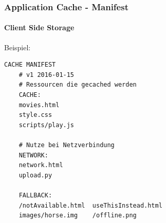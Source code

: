 \begin{frame}[fragile]
\frametitle{Application Cache - Manifest}
\framesubtitle{Client Side Storage}
	Beispiel:
	\begin{lstlisting}[language=manifest]
	CACHE MANIFEST
	# v1 2016-01-15	
	# Ressourcen die gecached werden 
	CACHE:
	movies.html
	style.css
	scripts/play.js
			
	# Nutze bei Netzverbindung
	NETWORK:
	network.html
	upload.py
			
	FALLBACK:
	/notAvailable.html	useThisInstead.html
	images/horse.img	/offline.png
	\end{lstlisting}
\end{frame}

